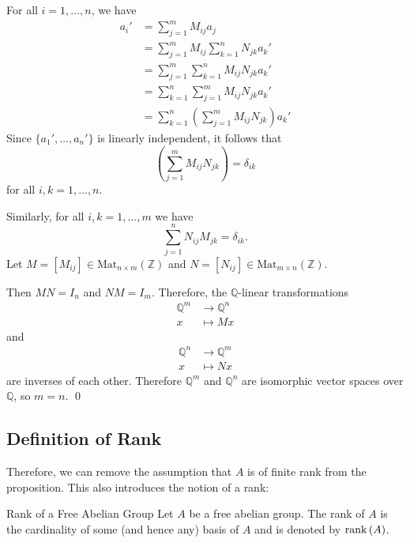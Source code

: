 \documentclass{article}
\renewenvironment{proof}{{\bfseries\color{blue1} Proof:}}{\qed}
\begin{document}
\begin{proof}
    For all $i=1,\dots,n$, we have
    \begin{align*}
        a_i' & = \sum_{j=1}^m M_{ij}a_j                                  \\
             & = \sum_{j=1}^m M_{ij} \sum_{k=1}^n N_{jk}a_k'             \\
             & = \sum_{j=1}^m\sum_{k=1}^n M_{ij}N_{jk}a_k'               \\
             & = \sum_{k=1}^n \sum_{j=1}^m M_{ij}N_{jk}a_k'              \\
             & = \sum_{k=1}^n\left( \sum_{j=1}^m M_{ij}N_{jk}\right)a_k'
    \end{align*}
    Since $\{a_1',\dots,a_n'\}$ is linearly independent, it follows that
    \begin{equation}
        \left( \sum_{j=1}^m M_{ij}N_{jk}\right) = \delta_{ik}
    \end{equation}
    for all $i,k=1,\dots,n$.

    Similarly, for all $i,k=1,\dots, m$ we have
    \begin{equation}
        \sum_{j=1}^n N_{ij}M_{jk} = \delta_{ik}.
    \end{equation}
    Let $M=[M_{ij}] \in \text{Mat}_{n\times m}(\mathbb{Z})$ and $N=[N_{ij}]\in \text{Mat}_{m\times n}(\mathbb{Z})$.

    Then $MN=I_n$ and $NM=I_m$. Therefore, the $\mathbb{Q}$-linear transformations
    \begin{align*}
        \mathbb{Q}^m & \rightarrow \mathbb{Q}^n \\
        x            & \mapsto Mx
    \end{align*}
    and
    \begin{align*}
        \mathbb{Q}^n & \rightarrow \mathbb{Q}^m \\
        x            & \mapsto Nx
    \end{align*}
    are inverses of each other. Therefore $\mathbb{Q}^m$ and $\mathbb{Q}^n$ are isomorphic vector spaces over $\mathbb{Q}$, so $m=n$.
\end{proof}
\subsection{Definition of Rank}
Therefore, we can remove the assumption that $A$ is of finite rank from the proposition. This also introduces the notion of a rank:
\begin{definition}{Rank of a Free Abelian Group}
    Let $A$ be a free abelian group. The rank of $A$ is the cardinality of some (and hence any) basis of $A$ and is denoted by $\mathrm{rank}\,(A)$.
\end{definition}
\end{document}
